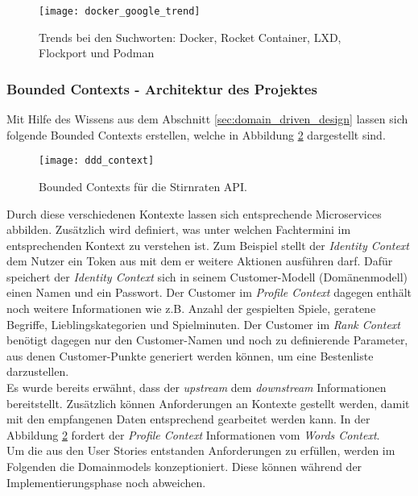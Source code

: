 {\begin{figure}[ht]
	\centering
	\texttt{[image: docker\_google\_trend]}
	\caption[Docker Google Trends] {Trends bei den Suchworten: Docker, Rocket Container, LXD, Flockport und Podman}
	\label{fig:docker_google_trends}
\end{figure}

\subsubsection{Bounded Contexts - Architektur des Projektes}
Mit Hilfe des Wissens aus dem Abschnitt \ref{sec:domain_driven_design} lassen sich folgende Bounded Contexts erstellen, welche in Abbildung \ref{fig:ddd_context} dargestellt sind.

\begin{figure}[ht]
	\centering
	\texttt{[image: ddd\_context]}
	\caption[Bounded Contexts für Stirnraten] {Bounded Contexts für die Stirnraten API.}
	\label{fig:ddd_context}
\end{figure}

Durch diese verschiedenen Kontexte lassen sich entsprechende Microservices abbilden. Zusätzlich wird definiert, was unter welchen Fachtermini im entsprechenden Kontext zu verstehen ist. Zum Beispiel stellt der \textit{Identity Context} dem Nutzer ein Token aus mit dem er weitere Aktionen ausführen darf. Dafür speichert der \textit{Identity Context} sich in seinem Customer-Modell (Domänenmodell) einen Namen und ein Passwort. Der Customer im \textit{Profile Context} dagegen enthält noch weitere Informationen wie z.B. Anzahl der gespielten Spiele, geratene Begriffe, Lieblingskategorien und Spielminuten. Der Customer im \textit{Rank Context} benötigt dagegen nur den Customer-Namen und noch zu definierende Parameter, aus denen Customer-Punkte generiert werden können, um eine Bestenliste darzustellen.\\

Es wurde bereits erwähnt, dass der \textit{upstream} dem \textit{downstream} Informationen bereitstellt. Zusätzlich können Anforderungen an Kontexte gestellt werden, damit mit den empfangenen Daten entsprechend gearbeitet werden kann. In der Abbildung \ref{fig:ddd_context} fordert der \textit{Profile Context} Informationen vom \textit{Words Context}.  \\

Um die aus den User Stories entstanden Anforderungen zu erfüllen, werden im Folgenden die Domainmodels konzeptioniert. Diese können während der Implementierungsphase noch abweichen. \\

}
